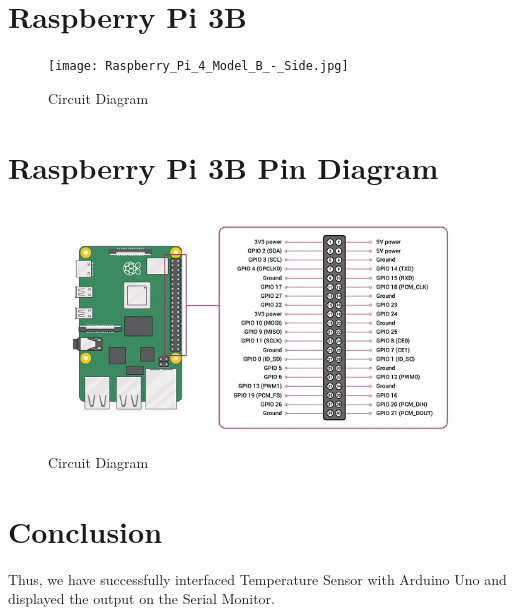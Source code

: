 \documentclass[11pt]{article}
\begin{document}
\section{Raspberry Pi 3B}

\begin{figure}[H]
	\centering
	\texttt{[image: Raspberry\_Pi\_4\_Model\_B\_-\_Side.jpg]}
	\caption{Circuit Diagram}
\end{figure}

\section{Raspberry Pi 3B Pin Diagram}

\begin{figure}[H]
	\centering
	\includegraphics[width=.75\textwidth]{gpio_pinout.jpg}
	\caption{Circuit Diagram}
\end{figure}

\section{Conclusion}
Thus, we have successfully interfaced Temperature Sensor with Arduino Uno and displayed the output on the Serial Monitor.
\clearpage
\end{document}
